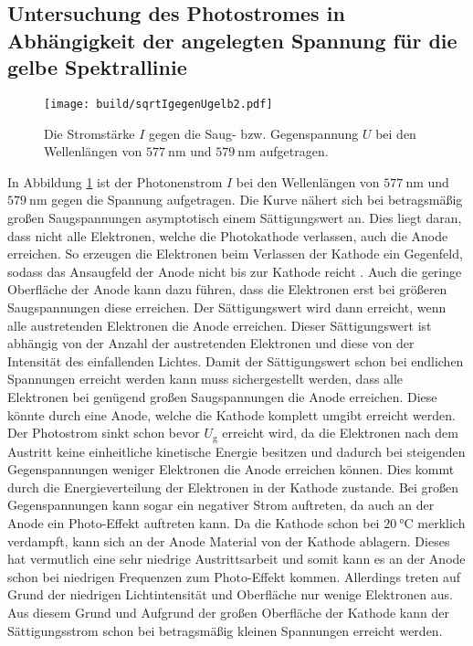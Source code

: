 \subsection{Untersuchung des Photostromes in Abhängigkeit der angelegten Spannung für die gelbe Spektrallinie}
\begin{figure}
	\centering
	\caption{Die Stromstärke $I$ gegen die Saug- bzw. Gegenspannung $U$ bei den Wellenlängen von $\SI{577}{\nano\meter}$ und $ \SI{579}{\nano\meter}$ aufgetragen.}
	\texttt{[image: build/sqrtIgegenUgelb2.pdf]}
	\label{fig:Graphgelb2}
\end{figure}
In Abbildung \ref{fig:Graphgelb2} ist der Photonenstrom $I$ bei den Wellenlängen von $\SI{577}{\nano\meter}$ und $\SI{579}{\nano\meter}$ gegen die Spannung aufgetragen. Die Kurve nähert sich bei betragsmäßig großen Saugspannungen asymptotisch  einem Sättigungswert an. Dies liegt daran, dass nicht alle Elektronen, welche die Photokathode verlassen, auch die Anode erreichen. So erzeugen die Elektronen beim Verlassen der Kathode ein Gegenfeld, sodass das Ansaugfeld der Anode nicht bis zur Kathode reicht \cite{V504}. Auch die geringe Oberfläche der Anode kann dazu führen, dass die Elektronen erst bei größeren Saugspannungen diese erreichen. Der Sättigungswert wird dann erreicht, wenn alle austretenden Elektronen die Anode erreichen. Dieser Sättigungswert ist abhängig von der Anzahl der austretenden Elektronen und diese von der Intensität des einfallenden Lichtes. Damit der Sättigungswert schon bei endlichen Spannungen erreicht werden kann muss sichergestellt werden, dass alle Elektronen bei genügend großen Saugspannungen die Anode erreichen. Diese könnte durch eine Anode, welche die Kathode komplett umgibt erreicht werden. Der Photostrom sinkt schon bevor $U_\text{g}$ erreicht wird, da die Elektronen nach dem Austritt keine einheitliche kinetische Energie besitzen und dadurch bei steigenden Gegenspannungen weniger Elektronen die Anode erreichen können. Dies kommt durch die Energieverteilung der Elektronen in der Kathode zustande. Bei großen Gegenspannungen kann sogar ein negativer Strom auftreten, da auch an der Anode ein Photo-Effekt auftreten kann. Da die Kathode schon bei $\SI{20}{\degreeCelsius}$ \cite{V500} merklich verdampft, kann sich an der Anode Material von der Kathode ablagern. Dieses hat vermutlich eine sehr niedrige Austrittsarbeit und somit kann es an der Anode schon bei niedrigen Frequenzen zum Photo-Effekt kommen. Allerdings treten auf Grund der niedrigen Lichtintensität und Oberfläche nur wenige Elektronen aus. Aus diesem Grund und Aufgrund der großen Oberfläche der Kathode kann der Sättigungsstrom schon bei betragsmäßig kleinen Spannungen erreicht werden.
